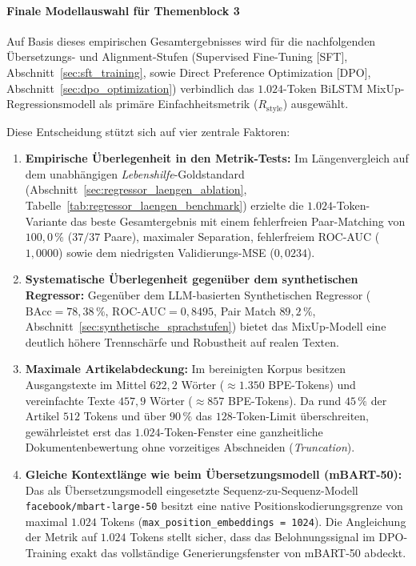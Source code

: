 \paragraph{Finale Modellauswahl für Themenblock 3}
Auf Basis dieses empirischen Gesamtergebnisses wird für die nachfolgenden Übersetzungs- und Alignment-Stufen (Supervised Fine-Tuning [SFT], Abschnitt~\ref{sec:sft_training}, sowie Direct Preference Optimization [DPO], Abschnitt~\ref{sec:dpo_optimization}) verbindlich das $1.024$-Token BiLSTM MixUp-Regressionsmodell als primäre Einfachheitsmetrik ($R_{\text{style}}$) ausgewählt.

Diese Entscheidung stützt sich auf vier zentrale Faktoren:
\begin{enumerate}
    \item \textbf{Empirische Überlegenheit in den Metrik-Tests:} Im Längenvergleich auf dem unabhängigen \textit{Lebenshilfe}-Goldstandard (Abschnitt~\ref{sec:regressor_laengen_ablation}, Tabelle~\ref{tab:regressor_laengen_benchmark}) erzielte die $1.024$-Token-Variante das beste Gesamtergebnis mit einem fehlerfreien Paar-Matching von $100{,}0\,\%$ ($37/37$ Paare), maximaler Separation, fehlerfreiem ROC-AUC ($1{,}0000$) sowie dem niedrigsten Validierungs-MSE ($0{,}0234$).
    \item \textbf{Systematische Überlegenheit gegenüber dem synthetischen Regressor:} Gegenüber dem LLM-basierten Synthetischen Regressor ($\text{BAcc} = 78{,}38\,\%$, $\text{ROC-AUC} = 0{,}8495$, Pair Match $89{,}2\,\%$, Abschnitt~\ref{sec:synthetische_sprachstufen}) bietet das MixUp-Modell eine deutlich höhere Trennschärfe und Robustheit auf realen Texten.
    \item \textbf{Maximale Artikelabdeckung:} Im bereinigten Korpus besitzen Ausgangstexte im Mittel $622{,}2$ Wörter ($\approx 1.350$ BPE-Tokens) und vereinfachte Texte $457{,}9$ Wörter ($\approx 857$ BPE-Tokens). Da rund $45\,\%$ der Artikel $512$ Tokens und über $90\,\%$ das $128$-Token-Limit überschreiten, gewährleistet erst das $1.024$-Token-Fenster eine ganzheitliche Dokumentenbewertung ohne vorzeitiges Abschneiden (\textit{Truncation}).
    \item \textbf{Gleiche Kontextlänge wie beim Übersetzungsmodell (mBART-50):} Das als Übersetzungsmodell eingesetzte Sequenz-zu-Sequenz-Modell \texttt{facebook/mbart-large-50} \citep{tang2020multilingual, liu2020multilingual} besitzt eine native Positionskodierungsgrenze von maximal $1.024$ Tokens (\texttt{max\_position\_embeddings = 1024}). Die Angleichung der Metrik auf $1.024$ Tokens stellt sicher, dass das Belohnungssignal im DPO-Training exakt das vollständige Generierungsfenster von mBART-50 abdeckt.
\end{enumerate}
